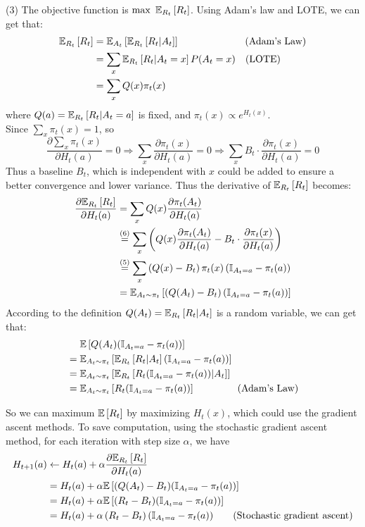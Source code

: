 (3) The objective function is $\max\ \E_{R_t}\left[R_t\right]$. Using Adam's law and LOTE, we can get that:
\begin{align*}
\E_{R_t}\left[R_t\right] &= \E_{A_t}\left[\E_{R_t}\left[R_t|A_t\right]\right] \qquad\qquad\qquad\ \ \text{(Adam's Law)} \\
&= \sum_{x}\E_{R_t}\left[R_t|A_t=x\right]P(A_t=x) \quad\text{(LOTE)} \\
&= \sum_x Q(x)\pi_t(x)
\end{align*}
where $Q(a)=\mathbb{E}_{R_t}\left[R_t|A_t=a\right]$ is fixed, and $\pi_t(x) \propto e^{H_t(x)}$. \\
Since $\sum\limits_x \pi_t(x) = 1$, so
\begin{equation}
\dfrac{\partial \sum_x\pi_t(x)}{\partial H_t(a)} = 0 \Rightarrow \sum\limits_x \dfrac{\partial \pi_t(x)}{\partial H_t(a)} = 0 \Rightarrow \sum\limits_x B_t\cdot \dfrac{\partial \pi_t(x)}{\partial H_t(a)} = 0
\end{equation}
Thus a baseline $B_t$, which is independent with $x$ could be added to ensure a better convergence and lower variance. Thus the derivative of $\mathbb{E}_{R_t}\left[R_t\right]$ becomes:
\begin{align*}
\dfrac{\partial \mathbb{E}_{R_t}\left[R_t\right]}{\partial H_t(a)} &= \sum_x Q(x)\dfrac{\partial \pi_t(A_t)}{\partial H_t(a)} \\
&\stackrel{(6)}{=} \sum_x \left(Q(x)\dfrac{\partial \pi_t(A_t)}{\partial H_t(a)} - B_t\cdot \dfrac{\partial \pi_t(x)}{\partial H_t(a)} \right) \\
&\stackrel{(5)}{=} \sum_x \left(Q(x)-B_t\right) \pi_t(x)\left(\mathbb{I}_{A_t=a} - \pi_t(a)\right) \\
&= \mathbb{E}_{A_t\sim\pi_t}\left[(Q(A_t)-B_t) \left(\mathbb{I}_{A_t=a} - \pi_t(a)\right)\right]
\end{align*}
According to the definition $Q(A_t)=\mathbb{E}_{R_t}\left[R_t|A_t\right]$ is a random variable, we can get that:
\begin{align*}
&\quad\ \mathbb{E}\left[Q(A_t) (\mathbb{I}_{A_t=a} - \pi_t(a))\right] \\
&= \mathbb{E}_{A_t\sim\pi_t}\left[\mathbb{E}_{R_t}\left[R_t|A_t\right] (\mathbb{I}_{A_t=a} - \pi_t(a))\right] \\
&= \mathbb{E}_{A_t\sim\pi_t}\left[\mathbb{E}_{R_t}\left[R_t(\mathbb{I}_{A_t=a} - \pi_t(a))|A_t\right]\right] \\
&= \mathbb{E}_{A_t\sim\pi_t}\left[R_t(\mathbb{I}_{A_t=a} - \pi_t(a))\right] \qquad\qquad\ \text{(Adam's Law)}
\end{align*}

So we can maximum $\mathbb{E}\left[R_t\right]$ by maximizing $H_t(x)$, which could use the gradient ascent methods. To save computation, using the stochastic gradient ascent method, for each iteration with step size $\alpha$, we have
\begin{align*}
H_{t+1}(a) &\gets H_t(a) +\alpha \dfrac{\partial \mathbb{E}_{R_t}\left[R_t\right]}{\partial H_t(a)} \\
&= H_t(a) +\alpha \mathbb{E}\left[(Q(A_t)-B_t) (\mathbb{I}_{A_t=a} - \pi_t(a))\right] \\
&= H_t(a) +\alpha \mathbb{E}\left[(R_t-B_t) (\mathbb{I}_{A_t=a} - \pi_t(a))\right] \\
&= H_t(a) +\alpha \left(R_t-B_t\right) (\mathbb{I}_{A_t=a} - \pi_t(a)) \qquad\text{(Stochastic gradient ascent)}
\end{align*}


